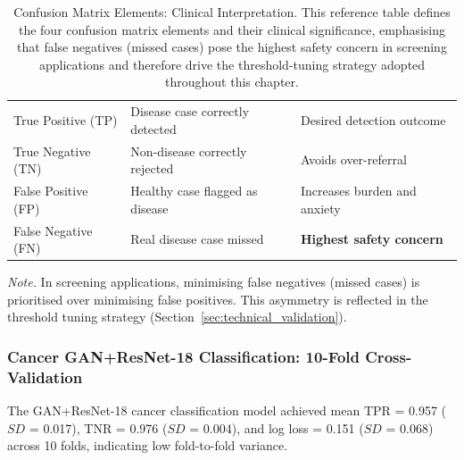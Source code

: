 {\tablestripes\tablefontsize
{}
\begin{xltabular}{\textwidth}{@{} l L L @{}}
\caption[Confusion Matrix Elements: Clinical Interpretation]{Confusion Matrix Elements: Clinical Interpretation. This reference table defines the four confusion matrix elements and their clinical significance, emphasising that false negatives (missed cases) pose the highest safety concern in screening applications and therefore drive the threshold-tuning strategy adopted throughout this chapter.}\label{tab:confusion_matrix_meaning} \\
\toprule
{} &  &  \\
\midrule
\endfirsthead
\endhead
\bottomrule
\endlastfoot
True Positive (TP) & Disease case correctly detected & Desired detection outcome \\
True Negative (TN) & Non-disease correctly rejected & Avoids over-referral \\
False Positive (FP) & Healthy case flagged as disease & Increases burden and anxiety \\
False Negative (FN) & Real disease case missed & \textbf{Highest safety concern} \\
\end{xltabular}}
\vspace{2pt}
\noindent\textit{Note.} In screening applications, minimising false negatives (missed cases) is prioritised over minimising false positives. This asymmetry is reflected in the threshold tuning strategy (Section~\ref{sec:technical_validation}).


\subsubsection{Cancer GAN+ResNet-18 Classification: 10-Fold Cross-Validation}

The GAN+ResNet-18 cancer classification model achieved mean TPR = 0.957 ($SD$ = 0.017), TNR = 0.976 ($SD$ = 0.004), and log loss = 0.151 ($SD$ = 0.068) across 10 folds, indicating low fold-to-fold variance.


